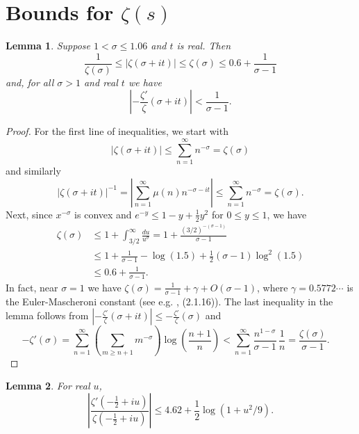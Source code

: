 \documentclass[10pt]{amsart}
\theoremstyle{remark}
\theoremstyle{plain}
\newtheorem{lemma}{Lemma}[section]
\numberwithin{equation}{section}
\theoremstyle{definition}
\def\({\left(}
\def\){\right)}
\def\pfrac#1#2{\left(\frac{#1}{#2}\right)}
\def\sg{\sigma}
\newcommand{\rev}[1]{{\color{red}#1}}
\begin{document}
%
\section{Bounds for $\zeta(s)$} \label{sec:zeta bounds}
%

\begin{lemma}\label{lem:zeta basic}
Suppose $1<\sigma\le 1.06$ and $t$ is real.  Then
$$
\frac{1}{\zeta(\sigma)} \le |\zeta(\sigma+it)| \le \zeta(\sigma) \le
0.6 + \frac{1}{\sigma-1}
$$
and, \rev{ for all $\sigma>1$ and real $t$ we have}
$$
\left| - \frac{\zeta'}{\zeta}(\sigma+it)\right| < \frac{1}{\sigma-1}.
$$
\end{lemma}

\begin{proof}
For the first line of inequalities, we start with
$$
|\zeta(\sigma+it)| \le \sum_{n=1}^\infty n^{-\sigma}= \zeta(\sigma)
$$
and similarly
$$
|\zeta(\sigma+it)|^{-1} = \left| \sum_{n=1}^\infty \mu(n) n^{-\sigma-it}
\right|  \le \sum_{n=1}^\infty n^{-\sigma}= \zeta(\sigma).
$$
Next, since $x^{-\sigma}$ is convex and $e^{-y}\le 1-y+\frac12 y^2$ for
$0\le y\le 1$, we have
\begin{align*}
\zeta(\sigma) &\le 1 + \int_{3/2}^\infty \frac{du}{u^\sigma} = 1 +
\frac{(3/2)^{-(\sigma-1)}}{\sigma-1} \\
&\le 1 + \frac{1}{\sigma-1}-\log(1.5)+\tfrac12 (\sigma-1)\log^2 (1.5) \\
&\le 0.6 + \frac{1}{\sigma-1}.
\end{align*}
In fact, near $\sigma=1$ we have $\zeta(\sigma)=\frac{1}{\sigma-1}+\gamma+
O(\sigma-1)$, where $\gamma=0.5772\cdots$ is the Euler-Mascheroni constant
(see e.g. \cite{T}, (2.1.16)).
The last inequality in the lemma
 follows from $|-\frac{\zeta'}{\zeta}(\sigma+it)| \le
-\frac{\zeta'}{\zeta}(\sigma)$ and
$$
-\zeta'(\sg)=\sum_{n=1}^\infty \( \sum_{m\ge n+1} m^{-\sigma} \)
 \log \pfrac{n+1}{n} <
\sum_{n=1}^\infty \frac{n^{1-\sg}}{\sg-1} \, \frac1{n} = \frac{\zeta(\sg)}
{\sg-1}.\quad\text{}
$$
\end{proof}

%
%

\begin{lemma}\label{lem:zeta on -1/2}
 For real $u$,
\[
\left| \frac{\zeta'(-\tfrac12+iu)}{\zeta(-\tfrac12+iu)} \right|
\le 4.62+ \frac12 \log(1+u^2/9).
\]
\end{lemma}
\end{document}
